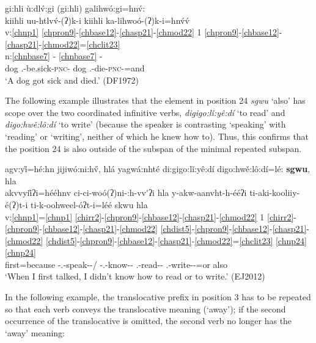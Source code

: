 \documentclass[output=paper]{langscibook}
\begin{document}
\ea\label{bkm:Ref72243228}gi:hli ù:dl\'{v}:gi (gi:hli) galihwó:gi=hn\'{v}: \\
\gllll kiihli uu-htlvv́-(ʔ)k-i kiihli ka-lihwoó-(ʔ)k-i=hn\'{v}\'{v}\\
v:\ref{chnp1} \ref{chpron9}-\ref{chbase12}-\ref{chasp21}-\ref{chmod22} 1 \ref{chpron9}-\ref{chbase12}-\ref{chasp21}-\ref{chmod22}=\ref{chclit23}\\
n:\ref{chnbase7} - \ref{chnbase7} -\\  
dog \Third\Sg.\Barg{}-be.sick-\textsc{pnc}-\Ind{} dog \Third\Sg.\Aarg{}-die-\textsc{pnc}-\Ind{}=and\\
\glt `A dog got sick and died.' (DF1972)
\z 
 
The following example illustrates that the element in position 24 \textit{sgwu} `also' has scope over the two coordinated infinitive verbs, \textit{digigo:lǐ:yê:dí} `to read' and \textit{digo:hwě:lô:dí} `to write' (because the speaker is contrasting `speaking' with `reading' or `writing', neither of which he knew how to). Thus, this confirms that the position 24 is also outside of the subspan of the minimal repeated subspan. 

\ea\label{ex:cher:key:76} {agv:y\H{i}=hé:hn jijiwó:ni:h\H{v}, hlá yagwá:nhté di:gigo:lǐ:yê:dí digo:hwě:lô:dí=lé: \textbf{sgwu}, hla} \\
\glll akvvyii\H{}ʔi=hééhnv ci-ci-woó(ʔ)ni-:h-vv\'{}ʔi hla y-akw-aanvht-h-ééʔi ti-aki-kooliiy-é(ʔ)t-i ti-k-oohweel-óʔt-i=léé skwu hla \\
v:\ref{chnp1}=\ref{chnp1} \ref{chirr2}-\ref{chpron9}-\ref{chbase12}-\ref{chasp21}-\ref{chmod22} 1 \ref{chirr2}-\ref{chpron9}-\ref{chbase12}-\ref{chasp21}-\ref{chmod22} \ref{chdist5}-\ref{chpron9}-\ref{chbase12}-\ref{chasp21}-\ref{chmod22} \ref{chdist5}-\ref{chpron9}-\ref{chbase12}-\ref{chasp21}-\ref{chmod22}=\ref{chclit23} \ref{chnp24} \ref{chnp24}\\
first=because \Rel{}-\First\Sg.\Aarg{}-speak-\Impf{}-\Asr/\Sh{} {} \Irr{}-\First\Sg.\Barg{}-know-\Stat{}-\Rep{} \First\Sg.\Barg{}-read-\Inf{}-\Nom{} \Third\Sg.\Aarg{}-write-\Inf{}-\Nom{}=or also \Neg{}\\
\glt `When I first talked, I didn't know how to read or to write.' (EJ2012)
\z 


In the following example, the translocative prefix in position 3 has to be repeated so that each verb conveys the translocative meaning (`away'); if the second occurrence of the translocative is omitted, the second verb no longer has the `away' meaning:
\end{document}
